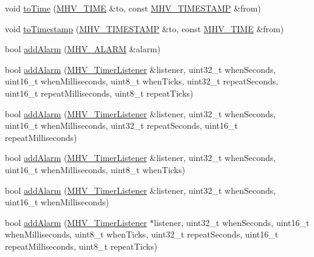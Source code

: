 \begin{DoxyCompactItemize}
void \hyperlink{class_m_h_v___r_t_c_aa0a908785e5445b1ab5d3bdb20f5fc62}{to\-Time} (\hyperlink{_m_h_v___r_t_c_8h_adace8912943ac21c837360427880df71}{\-M\-H\-V\-\_\-\-T\-I\-M\-E} \&to, const \hyperlink{_m_h_v___r_t_c_8h_a1e30d3a92b1b868286bd0d619245d8a6}{\-M\-H\-V\-\_\-\-T\-I\-M\-E\-S\-T\-A\-M\-P} \&from)
\item 
void \hyperlink{class_m_h_v___r_t_c_a3aecb460c309ca773933e0c82bbd7819}{to\-Timestamp} (\hyperlink{_m_h_v___r_t_c_8h_a1e30d3a92b1b868286bd0d619245d8a6}{\-M\-H\-V\-\_\-\-T\-I\-M\-E\-S\-T\-A\-M\-P} \&to, const \hyperlink{_m_h_v___r_t_c_8h_adace8912943ac21c837360427880df71}{\-M\-H\-V\-\_\-\-T\-I\-M\-E} \&from)
\item 
bool \hyperlink{class_m_h_v___r_t_c_ac58061c6f016d665a9027f8d55b9d5c0}{add\-Alarm} (\hyperlink{_m_h_v___r_t_c_8h_af13307658f41fba330ffae04dd5cbce6}{\-M\-H\-V\-\_\-\-A\-L\-A\-R\-M} \&alarm)
\item 
bool \hyperlink{class_m_h_v___r_t_c_a282b2b154eebe88db8f5f1225246c326}{add\-Alarm} (\hyperlink{class_m_h_v___timer_listener}{\-M\-H\-V\-\_\-\-Timer\-Listener} \&listener, uint32\-\_\-t when\-Seconds, uint16\-\_\-t when\-Milliseconds, uint8\-\_\-t when\-Ticks, uint32\-\_\-t repeat\-Seconds, uint16\-\_\-t repeat\-Milliseconds, uint8\-\_\-t repeat\-Ticks)
\item 
bool \hyperlink{class_m_h_v___r_t_c_a97f7ec7def5d867c1d193146100e203c}{add\-Alarm} (\hyperlink{class_m_h_v___timer_listener}{\-M\-H\-V\-\_\-\-Timer\-Listener} \&listener, uint32\-\_\-t when\-Seconds, uint16\-\_\-t when\-Milliseconds, uint32\-\_\-t repeat\-Seconds, uint16\-\_\-t repeat\-Milliseconds)
\item 
bool \hyperlink{class_m_h_v___r_t_c_a041fd4bd05c84350eedb8f60d9c8efdd}{add\-Alarm} (\hyperlink{class_m_h_v___timer_listener}{\-M\-H\-V\-\_\-\-Timer\-Listener} \&listener, uint32\-\_\-t when\-Seconds, uint16\-\_\-t when\-Milliseconds, uint8\-\_\-t when\-Ticks)
\item 
bool \hyperlink{class_m_h_v___r_t_c_a112fea9b79614666f60ee1c6930a8da6}{add\-Alarm} (\hyperlink{class_m_h_v___timer_listener}{\-M\-H\-V\-\_\-\-Timer\-Listener} \&listener, uint32\-\_\-t when\-Seconds, uint16\-\_\-t when\-Milliseconds)
\item 
bool \hyperlink{class_m_h_v___r_t_c_a8d39f027b7305abd0a12aea616d8577f}{add\-Alarm} (\hyperlink{class_m_h_v___timer_listener}{\-M\-H\-V\-\_\-\-Timer\-Listener} $\ast$listener, uint32\-\_\-t when\-Seconds, uint16\-\_\-t when\-Milliseconds, uint8\-\_\-t when\-Ticks, uint32\-\_\-t repeat\-Seconds, uint16\-\_\-t repeat\-Milliseconds, uint8\-\_\-t repeat\-Ticks)

\end{DoxyCompactItemize}
